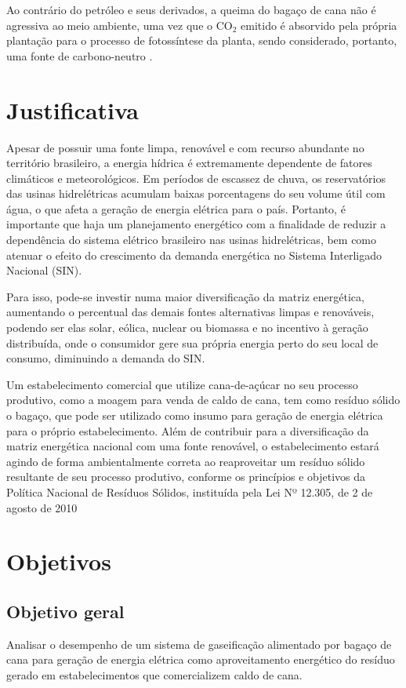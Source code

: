 Ao contrário do petróleo e seus derivados, a queima do bagaço de cana não é agressiva ao meio ambiente, uma vez que o CO$_2$ emitido é absorvido pela própria plantação para o processo de fotossíntese da planta, sendo considerado, portanto, uma fonte de carbono-neutro \cite{basu2010}.

\section{Justificativa}

Apesar de possuir uma fonte limpa, renovável e com recurso abundante no território brasileiro, a energia hídrica é extremamente dependente de fatores climáticos e meteorológicos. Em períodos de escassez de chuva, os reservatórios das usinas hidrelétricas acumulam baixas porcentagens do seu volume útil com água, o que afeta a geração de energia elétrica para o país. Portanto, é importante que haja um planejamento energético com a finalidade de reduzir a dependência do sistema elétrico brasileiro nas usinas hidrelétricas, bem como atenuar o efeito do crescimento da demanda energética no Sistema Interligado Nacional (SIN). 

Para isso, pode-se investir numa maior diversificação da matriz energética, aumentando o percentual das demais fontes alternativas limpas e renováveis, podendo ser elas solar, eólica, nuclear ou biomassa e no incentivo à geração distribuída, onde o consumidor gere sua própria energia perto do seu local de consumo, diminuindo a demanda do SIN. 

Um estabelecimento comercial que utilize cana-de-açúcar no seu processo produtivo, como a moagem para venda de caldo de cana, tem como resíduo sólido o bagaço, que pode ser utilizado como insumo para geração de energia elétrica para o próprio estabelecimento.  Além de contribuir para a diversificação da matriz energética nacional com uma fonte renovável, o estabelecimento estará agindo de forma ambientalmente correta ao reaproveitar um resíduo sólido resultante de seu processo produtivo, conforme os princípios e objetivos da Política Nacional de Resíduos Sólidos, instituída pela Lei Nº 12.305, de 2 de agosto de 2010 %

\section{Objetivos}
\subsection{Objetivo geral}
Analisar o desempenho de um sistema de gaseificação alimentado por bagaço de cana para geração de energia elétrica como aproveitamento energético do resíduo gerado em estabelecimentos que comercializem caldo de cana.

